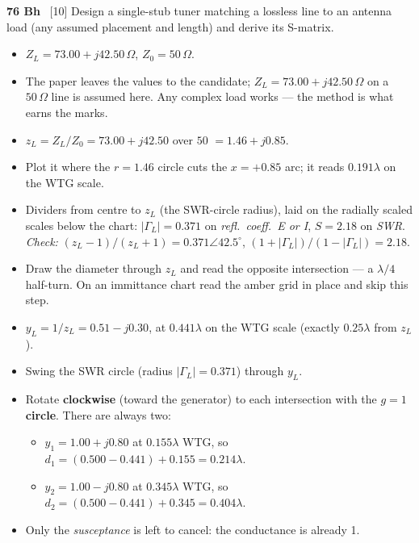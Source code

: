 \begin{asked}{\textbf{76 Bh} \ [10]}
Design a single-stub tuner matching a lossless line to an antenna load (any assumed placement and length) and derive its S-matrix.
\end{asked}
\begin{itemize}
  \item $Z_L = 73.00 + j42.50\,\Omega$, $Z_0 = 50\,\Omega$.
  \item \added{} The paper leaves the values to the candidate; $Z_L = 73.00 + j42.50\,\Omega$ on a $50\,\Omega$ line is assumed here. Any complex load works --- the method is what earns the marks.
\end{itemize}
\begin{itemize}
  \item $z_L = Z_L/Z_0 = 73.00 + j42.50$ over $50$ $=1.46 + j0.85$.
  \item Plot it where the $r = 1.46$ circle cuts the $x = +0.85$ arc; it reads $0.191\lambda$ on the WTG scale.
  \item Dividers from centre to $z_L$ (the SWR-circle radius), laid on the radially scaled scales below the chart: $|\Gamma_L| = 0.371$ on \emph{refl.\ coeff.\ E or I}, $S = 2.18$ on \emph{SWR}. \textit{Check:} $(z_L-1)/(z_L+1) = 0.371\angle 42.5^\circ$, $(1+|\Gamma_L|)/(1-|\Gamma_L|) = 2.18$.
\end{itemize}
\begin{itemize}
  \item Draw the diameter through $z_L$ and read the opposite intersection --- a $\lambda/4$ half-turn. On an immittance chart read the amber grid in place and skip this step.
  \item $y_L = 1/z_L = 0.51 - j0.30$, at $0.441\lambda$ on the WTG scale (exactly $0.25\lambda$ from $z_L$).
\end{itemize}
\begin{itemize}
  \item Swing the SWR circle (radius $|\Gamma_L| = 0.371$) through $y_L$.
  \item Rotate \textbf{clockwise} (toward the generator) to each intersection with the \textbf{$g=1$ circle}. There are always two:
  \begin{itemize}
    \item $y_1 = 1.00 + j0.80$ at $0.155\lambda$ WTG, so $d_1 = (0.500 - 0.441) + 0.155 = 0.214\lambda$.
    \item $y_2 = 1.00 - j0.80$ at $0.345\lambda$ WTG, so $d_2 = (0.500 - 0.441) + 0.345 = 0.404\lambda$.
  \end{itemize}
  \item Only the \emph{susceptance} is left to cancel: the conductance is already 1.
\end{itemize}
